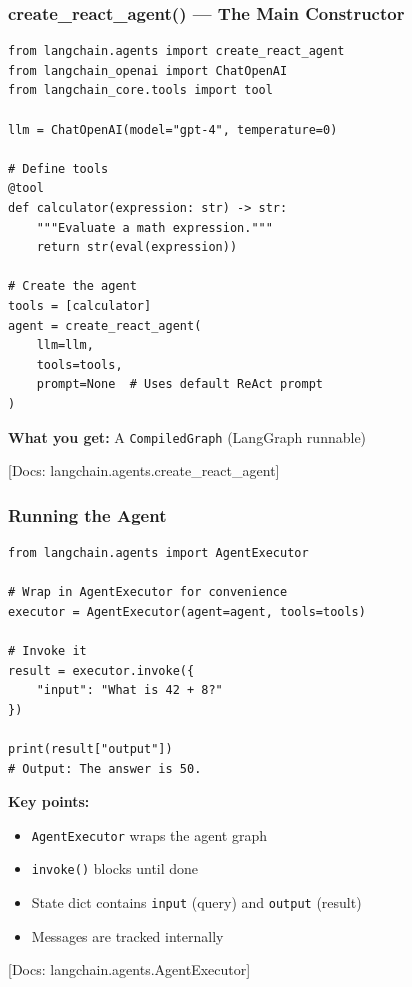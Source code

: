 \documentclass[aspectratio=169,11pt]{beamer}
\newcommand{\docref}[1]{{\scriptsize\color{docgray}[Docs: #1]}}
\begin{document}
\begin{frame}[fragile]
\frametitle{create\_react\_agent() — The Main Constructor}

\begin{lstlisting}
from langchain.agents import create_react_agent
from langchain_openai import ChatOpenAI
from langchain_core.tools import tool

llm = ChatOpenAI(model="gpt-4", temperature=0)

# Define tools
@tool
def calculator(expression: str) -> str:
    """Evaluate a math expression."""
    return str(eval(expression))

# Create the agent
tools = [calculator]
agent = create_react_agent(
    llm=llm,
    tools=tools,
    prompt=None  # Uses default ReAct prompt
)
\end{lstlisting}

\vspace{0.3cm}

\textbf{What you get:} A \texttt{CompiledGraph} (LangGraph runnable)

\docref{langchain.agents.create\_react\_agent}

\end{frame}

\begin{frame}[fragile]
\frametitle{Running the Agent}

\begin{lstlisting}
from langchain.agents import AgentExecutor

# Wrap in AgentExecutor for convenience
executor = AgentExecutor(agent=agent, tools=tools)

# Invoke it
result = executor.invoke({
    "input": "What is 42 + 8?"
})

print(result["output"])
# Output: The answer is 50.
\end{lstlisting}

\vspace{0.5cm}

\textbf{Key points:}
\begin{itemize}
  \item \texttt{AgentExecutor} wraps the agent graph
  \item \texttt{invoke()} blocks until done
  \item State dict contains \texttt{input} (query) and \texttt{output} (result)
  \item Messages are tracked internally
\end{itemize}

\docref{langchain.agents.AgentExecutor}

\end{frame}
\end{document}
